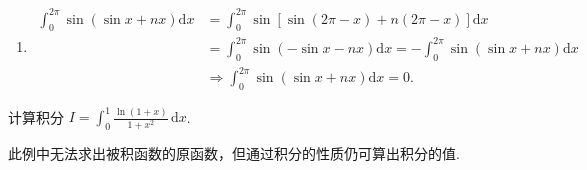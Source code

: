 \documentclass[../../main.tex]{subfiles}
\begin{document}
\begin{solution}
\begin{enumerate}
\item\begin{align*}
\int_0^{2\pi}{\sin \left( \sin x+nx \right) \mathrm{d}x}&=\int_0^{2\pi}{\sin \left[ \sin \left( 2\pi -x \right) +n\left( 2\pi -x \right) \right] \mathrm{d}x}
\\
&=\int_0^{2\pi}{\sin \left( -\sin x-nx \right) \mathrm{d}x}=-\int_0^{2\pi}{\sin \left( \sin x+nx \right) \mathrm{d}x}
\\
&\Longrightarrow \int_0^{2\pi}{\sin \left( \sin x+nx \right) \mathrm{d}x}=0.
\end{align*} 
\end{enumerate}
\end{solution}

\begin{example}
计算积分 \( I = \int_{0}^{1} \frac{\ln(1 + x)}{1 + x^2} \, \mathrm{d}x \).
\end{example}
\begin{remark}
此例中无法求出被积函数的原函数，但通过积分的性质仍可算出积分的值.
\end{remark}
\end{document}
